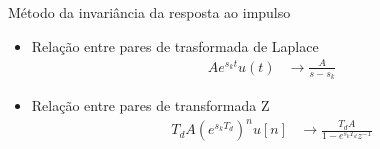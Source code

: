 \begin{slide}{Método da invariância da resposta ao impulso}
	\begin{itemize}
		\item Relação entre pares de trasformada de Laplace
			\begin{align*}
				Ae^{s_kt}u(t) &\rightarrow \frac{A}{s-s_k}
			\end{align*}
		\item Relação entre pares de transformada Z
			\begin{align*}
				T_dA(e^{s_kT_d})^nu[n] &\rightarrow \frac{T_dA}{1-e^{s_kT_d}z^{-1}}
			\end{align*}
	\end{itemize}
\end{slide}

